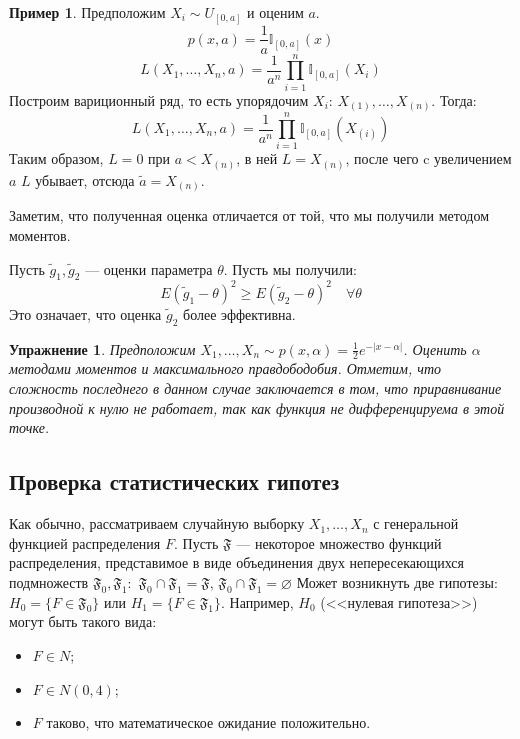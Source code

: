 \documentclass[11pt,openany,a4paper]{scrartcl}
\theoremstyle{plain}
\newtheorem{exercise}[theorem]{Упражнение}
\theoremstyle{definition}
\newtheorem{example}[theorem]{Пример}
\newcommand\mb{\mathbb}
\begin{document}
\begin{example}
        Предположим $X_i \sim U_{[0, a]}$ и оценим $a$.
        $$
        p(x, a) = \frac{1}{a}\mb I_{[0, a]}(x)
        $$
        $$
        L(X_1, \ldots, X_n, a) = \frac{1}{a^n}\prod\limits_{i=1}^n\mb I_{[0, a]}(X_i)
        $$
        Построим вариционный ряд, то есть упорядочим $X_i$: $X_{(1)}, \ldots, X_{(n)}$.
        Тогда:
        $$
        L(X_1, \ldots, X_n, a) = \frac{1}{a^n}\prod\limits_{i=1}^n\mb I_{[0, a]}(X_{(i)})
        $$
        Таким образом, $L=0$ при $a < X_{(n)}$, в ней $L=X_{(n)}$, после
        чего c увеличением $a$ $L$ убывает, отсюда $\widetilde a = X_{(n)}$.
        
        Заметим, что полученная оценка отличается от той, что мы получили методом моментов.
\end{example}

Пусть $\widetilde g_1, \widetilde g_2$ — оценки параметра $\theta$. Пусть мы получили:
$$
E(\widetilde g_1 - \theta)^2 \geqslant E(\widetilde g_2 - \theta)^2\quad \forall \theta
$$
Это означает, что оценка $\widetilde g_2$ более эффективна.

\begin{exercise}
    Предположим $X_1, \ldots, X_n \sim p(x, \alpha) = \frac{1}{2} e^{-|x-\alpha|}$.
    Оценить $\alpha$ методами моментов и максимального правдободобия. Отметим, что сложность
    последнего в данном случае заключается в том, что приравнивание производной к нулю не работает,
    так как функция не дифференцируема в этой точке.
\end{exercise}

\subsection{Проверка статистических гипотез}

Как обычно, рассматриваем случайную выборку $X_1, \ldots, X_n$ с генеральной функцией распределения
$F$. Пусть $\mathfrak F$ — некоторое множество функций распределения, представимое в виде 
объединения двух непересекающихся подмножеств $\mathfrak F_0, \mathfrak F_1:$
$\mathfrak F_0 \cap \mathfrak F_1 = \mathfrak F$, $\mathfrak F_0 \cap \mathfrak F_1 = \varnothing$
Может возникнуть две гипотезы: $H_0 = \{F \in \mathfrak F_0\}$ или $H_1 = \{F \in \mathfrak F_1\}$.
Например, $H_0$ (<<нулевая гипотеза>>) могут быть такого вида:
\begin{itemize}
    \item $F \in N$;
    \item $F \in N(0, 4)$;
    \item $F$ таково, что математическое ожидание положительно.
\end{itemize}
\end{document}
